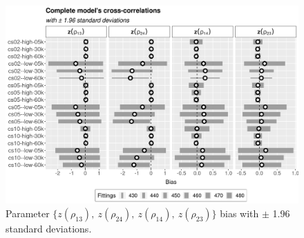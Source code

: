 \documentclass[a4paper,12pt]{article}
\begin{document}
\begin{figure}[H]
 \centering
 \includegraphics[width=\linewidth]{../../THESIS/thesis/figures/bias2plotsd-13.png}
 \vspace{-0.75cm}
 \caption{Parameter
   \(\{z(\rho_{13}),~z(\rho_{24}),~z(\rho_{14}),~z(\rho_{23})\}\) bias
   with \(\pm\) 1.96 standard deviations.}
 \label{fig:biassdrhoz4}
\end{figure}


 
\end{document}
